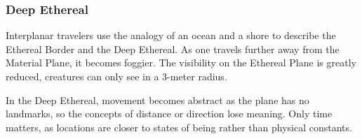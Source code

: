 





\subsubsection{Deep Ethereal}
Interplanar travelers use the analogy of an ocean and a shore to describe the Ethereal Border and the Deep Ethereal. As one travels further away from the Material Plane, it becomes foggier. The visibility on the Ethereal Plane is greatly reduced, creatures can only see in a 3-meter radius.

In the Deep Ethereal, movement becomes abstract as the plane has no landmarks, so the concepts of distance or direction lose meaning. Only time matters, as locations are closer to states of being rather than physical constants.


